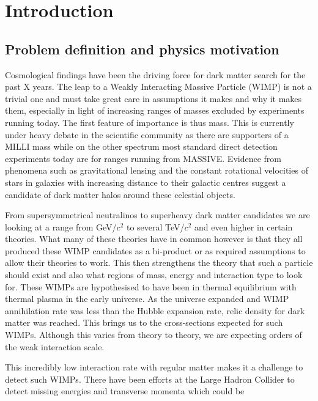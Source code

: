 \documentclass[11pt]{article} %
\begin{document}
\pagebreak
\section{Introduction}
\subsection{Problem definition and physics motivation}

\par Cosmological findings have been the driving force for dark matter search for the past X years.
The leap to a Weakly Interacting Massive Particle (WIMP) is not a trivial one and must take great care in assumptions 
it makes and why it makes them, especially in light of increasing ranges of masses excluded by experiments running today.
The first feature of importance is thus mass. 
This is currently under heavy debate in the scientific community as there are supporters of a MILLI mass while on the other spectrum most standard direct
detection experiments today are for ranges running from MASSIVE.
Evidence from phenomena such as gravitational lensing and the constant rotational velocities of stars in galaxies with increasing
distance to their galactic centres suggest a candidate of dark matter halos around these celestial objects.
\\ 
\par From supersymmetrical neutralinos to superheavy dark matter candidates we are looking at a range from GeV/$c^2$ to several TeV/$c^2$ and even higher in certain theories.
What many of these theories have in common however is that they all produced these WIMP candidates as a bi-product or as required assumptions
to allow their theories to work.
This then strengthens the theory that such a particle should exist and also what regions of mass, energy and interaction type to look for.
These WIMPs are hypothesised to have been in thermal equilibrium with thermal plasma in the early universe. 
As the universe expanded and WIMP annihilation rate was less than the Hubble expansion rate, relic density for dark matter was reached.
This brings us to the cross-sections expected for such WIMPs.
Although this varies from theory to theory, we are expecting orders of the weak interaction scale. 
\\
\par This incredibly low interaction rate with regular matter makes it a challenge to detect such WIMPs.
There have been efforts at the Large Hadron Collider to detect missing energies and transverse momenta which could be
\end{document}
